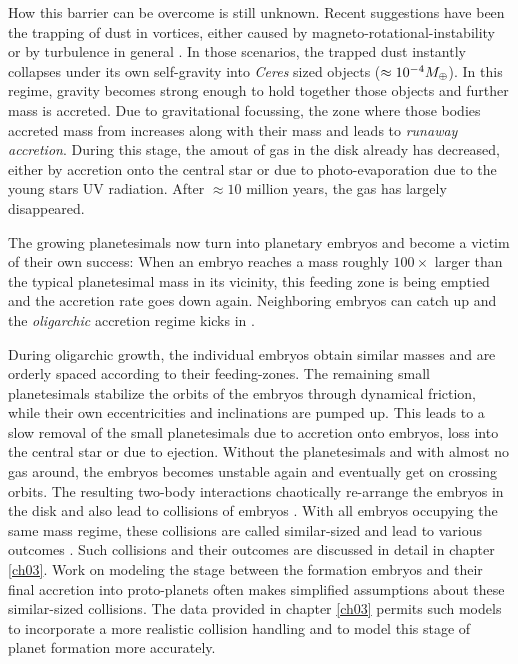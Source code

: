 How this barrier can be overcome is still unknown. Recent suggestions have been the trapping of dust in vortices, either caused by magneto-rotational-instability \citep{Johansen:2007p37} or by turbulence in general \citep{2008ApJ...686.1292I}. In those scenarios, the trapped dust instantly collapses under its own self-gravity into \emph{Ceres} sized objects ($\approx 10^{-4} M_{\oplus}$). In this regime, gravity becomes strong enough to hold together those objects and further mass is accreted. Due to gravitational focussing, the zone where those bodies accreted mass from increases along with their mass and leads to \emph{runaway accretion}. During this stage, the amout of gas in the disk already has decreased, either by accretion onto the central star or due to photo-evaporation due to the young stars UV radiation. After $\approx 10$ million years, the gas has largely disappeared.

The growing planetesimals now turn into planetary embryos and become a victim of their own success: When an embryo reaches a mass roughly $ 100\times$ larger than the typical planetesimal mass in its vicinity, this feeding zone is being emptied and the accretion rate goes down again. Neighboring embryos can catch up and the \emph{oligarchic} accretion regime kicks in \citep{1993Icar..106..210I, 2010ApJ...714L.103O}.

During oligarchic growth, the individual embryos obtain similar masses and are orderly spaced according to their feeding-zones. The remaining small planetesimals stabilize the orbits of the embryos through dynamical friction, while their own eccentricities and inclinations are pumped up. This leads to a slow removal of the small planetesimals due to accretion onto embryos, loss into the central star or due to ejection. Without the planetesimals and with almost no gas around, the embryos becomes unstable again and eventually get on crossing orbits. The resulting two-body interactions chaotically re-arrange the embryos in the disk and also lead to collisions of embryos \cite{Chambers:2001p2105, Chambers:2004p4098}. With all embryos occupying the same mass regime, these collisions are called similar-sized and lead to various outcomes \cite{Asphaug:2010p3539}. Such collisions and their outcomes are discussed in detail in chapter \ref{ch03}. Work on modeling the stage between the formation embryos and their final accretion into proto-planets \citep{Chambers:2001p2105, 2006Icar..184...39O} often makes simplified assumptions about these similar-sized collisions. The data provided in chapter \ref{ch03} permits such models to incorporate a more realistic collision handling and to model this stage of planet formation more accurately.

